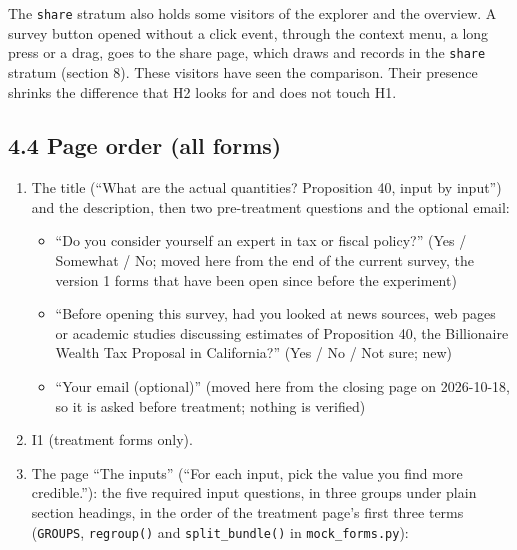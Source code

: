 The \texttt{share} stratum also holds some visitors of the explorer and the overview. A survey button
opened without a click event, through the context menu, a long press or a drag, goes to the share
page, which draws and records in the \texttt{share} stratum (section 8). These visitors have seen the
comparison. Their presence shrinks the difference that H2 looks for and does not touch H1.

\subsection{4.4 Page order (all forms)}\label{page-order-all-forms}

\begin{enumerate}
\def\labelenumi{\arabic{enumi}.}
\item
  The title (``What are the actual quantities? Proposition 40, input by input'') and the
  description, then two pre-treatment questions and the optional email:

  \begin{itemize}
  \tightlist
  \item
    ``Do you consider yourself an expert in tax or fiscal policy?'' (Yes / Somewhat / No; moved here
    from the end of the current survey, the version 1 forms that have been open since before the
    experiment)
  \item
    ``Before opening this survey, had you looked at news sources, web pages or academic studies
    discussing estimates of Proposition 40, the Billionaire Wealth Tax Proposal in California?''
    (Yes / No / Not sure; new)
  \item
    ``Your email (optional)'' (moved here from the closing page on 2026-10-18, so it is asked before
    treatment; nothing is verified)
  \end{itemize}
\item
  I1 (treatment forms only).
\item
  The page ``The inputs'' (``For each input, pick the value you find more credible.''): the five
  required input questions, in three groups under plain section headings, in the order
  of the treatment page's first three terms (\texttt{GROUPS}, \texttt{regroup()} and \texttt{split\_bundle()} in
  \texttt{mock\_forms.py}):


\end{enumerate}
